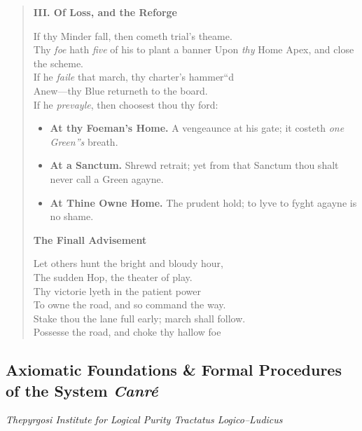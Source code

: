 \documentclass[11pt]{article}
\begin{document}
\begin{quote}
\medskip
\textbf{III. Of Loss, and the Reforge}

If thy Minder fall, then cometh trial's theame.\\
Thy \emph{foe} hath \emph{five} of his to plant a banner
Upon \emph{thy} Home Apex, and close the scheme.\\
If he \emph{faile} that march, thy charter's hammer``d\\
Anew---thy Blue returneth to the board.\\
If he \emph{prevayle}, then choosest thou thy ford:\\[-0.25em]
\begin{itemize}\itemsep0.2em
  \item \textbf{At thy Foeman's Home.} A vengeaunce at his gate; it costeth \emph{one Green''s} breath.
  \item \textbf{At a Sanctum.} Shrewd retrait; yet from that Sanctum thou shalt never call a Green agayne.
  \item \textbf{At Thine Owne Home.} The prudent hold; to lyve to fyght agayne is no shame.
\end{itemize}

\medskip
\textbf{The Finall Advisement}

Let others hunt the bright and bloudy hour,\\
The sudden Hop, the theater of play.\\
Thy victorie lyeth in the patient power\\
To owne the road, and so command the way.\\
Stake thou the lane full early; march shall follow.\\
Possesse the road, and choke thy hallow foe
\end{quote}

\clearpage

\subsection{Axiomatic Foundations \& Formal Procedures of the System \textit{Canré}}
\noindent\textit{Thepyrgosi Institute for Logical Purity \quad Tractatus Logico--Ludicus}
\end{document}
